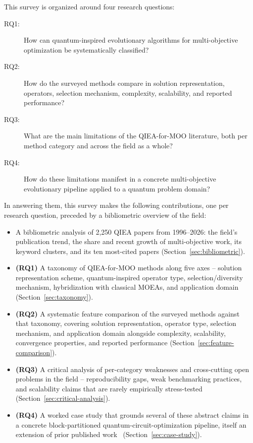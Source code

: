 This survey is organized around four research questions:
\begin{description}
  \item[RQ1:] How can quantum-inspired evolutionary algorithms for
    multi-objective optimization be systematically classified?
  \item[RQ2:] How do the surveyed methods compare in solution representation,
    operators, selection mechanism, complexity, scalability, and
    reported performance?
  \item[RQ3:] What are the main limitations of the QIEA-for-MOO
    literature, both per method category and across the field as a
    whole?
  \item[RQ4:] How do these limitations manifest in a concrete
    multi-objective evolutionary pipeline applied to a quantum problem
    domain?
\end{description}
In answering them, this survey makes the following contributions, one
per research question, preceded by a bibliometric overview of the field:
\begin{itemize}
  \item A bibliometric analysis of 2{,}250 QIEA papers from 1996--2026:
    the field's publication trend, the share and recent growth of
    multi-objective work, its keyword clusters, and its ten most-cited
    papers (Section~\ref{sec:bibliometric}).
  \item \textbf{(RQ1)} A taxonomy of QIEA-for-MOO methods along five axes --
    solution representation scheme, quantum-inspired operator type,
    selection/diversity mechanism, hybridization with classical MOEAs,
    and application domain (Section~\ref{sec:taxonomy}).
  \item \textbf{(RQ2)} A systematic feature comparison of the surveyed methods against
    that taxonomy, covering solution representation, operator type, selection
    mechanism, and application domain alongside complexity, scalability,
    convergence properties, and reported performance
    (Section~\ref{sec:feature-comparison}).
  \item \textbf{(RQ3)} A critical analysis of per-category weaknesses and cross-cutting
    open problems in the field -- reproducibility gaps, weak
    benchmarking practices, and scalability claims that are rarely
    empirically stress-tested (Section~\ref{sec:critical-analysis}).
  \item \textbf{(RQ4)} A worked case study that grounds several of these abstract claims
    in a concrete block-partitioned quantum-circuit-optimization
    pipeline, itself an extension of prior published
    work~\citep{ghlib2026scalable} (Section~\ref{sec:case-study}).
\end{itemize}

